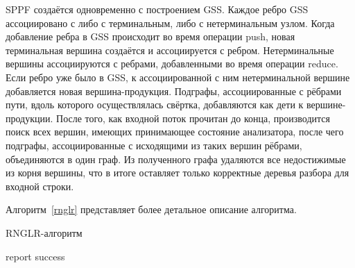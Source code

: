 SPPF создаётся одновременно с построением GSS. Каждое ребро GSS ассоциировано с либо с терминальным, либо с нетерминальным узлом. Когда добавление ребра в GSS происходит во время операции push, новая терминальная вершина создаётся и ассоциируется с ребром. Нетерминальные вершины ассоциируются с ребрами, добавленными во время операции reduce. Если ребро уже было в GSS, к ассоциированной с ним нетерминальной вершине добавляется новая вершина-продукция. Подграфы, ассоциированные с рёбрами пути, вдоль которого осуществлялась свёртка, добавляются как дети к вершине-продукции. После того, как входной поток прочитан до конца, производится поиск всех вершин, имеющих принимающее состояние анализатора, после чего подграфы, ассоциированные с исходящими из таких вершин рёбрами, объединяются в один граф. Из полученного графа удаляются все недостижимые из корня вершины, что в итоге оставляет только корректные деревья разбора для входной строки. 

Алгоритм~\ref{rnglr} представляет более детальное описание алгоритма.

\newpage

\begin{algorithm}[H]
\begin{algorithmic}[1]
\caption{RNGLR-алгоритм}
\label{rnglr}
   
   
     {report success}
    \EndIf
  \Else
    \EndFor
    \EndIf
  \EndIf
\EndFunction
{}
    \EndFor
  \EndWhile
\EndFunction
{}
  \EndWhile
\EndFunction
\end{algorithmic}
\end{algorithm}

